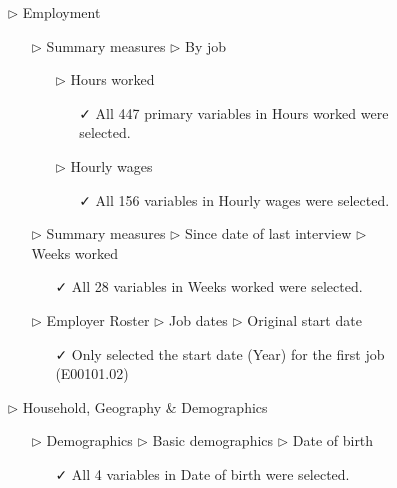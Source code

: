 \documentclass{article}
\begin{document}
\begin{figure}[t]
\begin{tcolorbox}[title = Navigating the data source]
\begin{itemize}
\begin{itemize}
\begin{itemize}
\begin{itemize}
\end{itemize}
\end{itemize}
\end{itemize}
\item[$\triangleright$] Employment
\begin{itemize}
\item[$\triangleright$] Summary measures $\triangleright$ By job
\begin{itemize}
\item[$\triangleright$] Hours worked  
\begin{itemize}
\item[\faCheck] All 447 primary variables in Hours worked were selected.
\end{itemize}
\item[$\triangleright$] Hourly wages
\begin{itemize}
\item[\faCheck] All 156 variables in Hourly wages were selected.
\end{itemize}
\end{itemize}
\end{itemize}
\begin{itemize}
\item[$\triangleright$] Summary measures $\triangleright$ Since date of last interview $\triangleright$ Weeks worked
\begin{itemize}
\item[\faCheck] All 28 variables in Weeks worked were selected.
\end{itemize}
\end{itemize}
\begin{itemize}
\item[$\triangleright$] Employer Roster $\triangleright$ Job dates $\triangleright$ Original start date
\begin{itemize}
\item[\faCheck] Only selected the start date (Year) for the first job (E00101.02)
\end{itemize}
\end{itemize}
\item[$\triangleright$] Household, Geography \& Demographics
\begin{itemize}
\item[$\triangleright$] Demographics $\triangleright$ Basic demographics $\triangleright$ Date of birth
\begin{itemize}
\item[\faCheck] All 4 variables in Date of birth were selected. 
\end{itemize}

\end{itemize}
\end{itemize}
\end{tcolorbox}
\end{figure}
\end{document}
